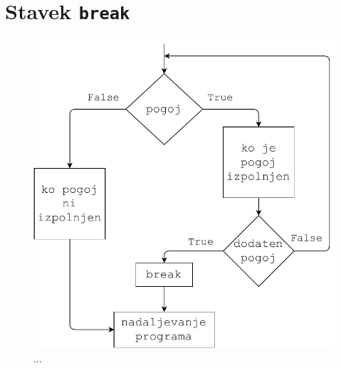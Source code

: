 \section{Stavek \texttt{break}}

\begin{figure}
    \centering
    \includegraphics[width=0.5\linewidth]{img/while2.pdf}
    \caption{...}
    \label{img:while2}
\end{figure}